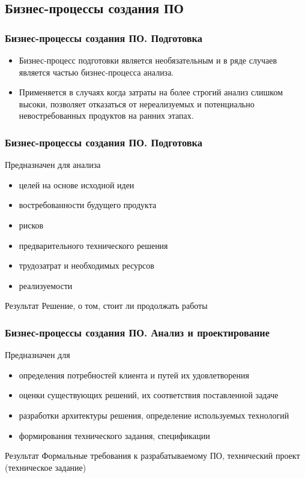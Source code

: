 \documentclass{../industrial-development}
\begin{document}
\subsection{Бизнес-процессы создания ПО}


\begin{frame} \frametitle{Бизнес-процессы создания ПО. Подготовка}
	\begin{itemize}
		\item Бизнес-процесс подготовки является необязательным и в ряде случаев является частью бизнес-процесса анализа.
		\item Применяется в случаях когда затраты на более строгий анализ слишком высоки, позволяет отказаться от нереализуемых и потенциально невостребованных продуктов на ранних этапах.
	\end{itemize}
\end{frame}
\lecturenotes


\begin{frame} \frametitle{Бизнес-процессы создания ПО. Подготовка}
	\begin{block}{Предназначен для анализа}
		\begin{itemize}
			\item целей на основе исходной идеи
			\item востребованности будущего продукта
			\item рисков
			\item предварительного технического решения
			\item трудозатрат и необходимых ресурсов
			\item реализуемости
		\end{itemize}
	\end{block}
	\begin{block}{Результат}
		Решение, о том, стоит ли продолжать работы
	\end{block}
\end{frame}
\lecturenotes


\begin{frame} \frametitle{Бизнес-процессы создания ПО. Анализ и проектирование}
	\begin{block}{Предназначен для}
		\begin{itemize}
			\item определения потребностей клиента и путей их удовлетворения
			\item оценки существующих решений, их соответствия поставленной задаче
			\item разработки архитектуры решения, определение используемых технологий
			\item формирования технического задания, спецификации
		\end{itemize}
	\end{block}
	\begin{block}{Результат}
		Формальные требования к разрабатываемому ПО, технический проект (техническое задание)
	\end{block}
\end{frame}
\lecturenotes
\end{document}
